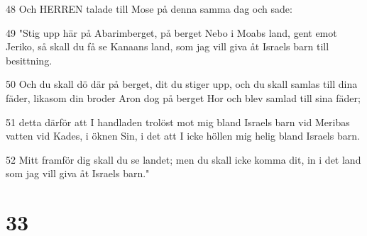 \par 48 Och HERREN talade till Mose på denna samma dag och sade:
\par 49 "Stig upp här på Abarimberget, på berget Nebo i Moabs land, gent emot Jeriko, så skall du få se Kanaans land, som jag vill giva åt Israels barn till besittning.
\par 50 Och du skall dö där på berget, dit du stiger upp, och du skall samlas till dina fäder, likasom din broder Aron dog på berget Hor och blev samlad till sina fäder;
\par 51 detta därför att I handladen trolöst mot mig bland Israels barn vid Meribas vatten vid Kades, i öknen Sin, i det att I icke höllen mig helig bland Israels barn.
\par 52 Mitt framför dig skall du se landet; men du skall icke komma dit, in i det land som jag vill giva åt Israels barn."

\chapter{33}


